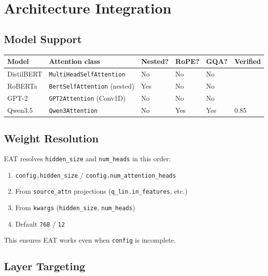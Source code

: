 
\section{Architecture Integration}

\subsection{Model Support}

\begin{table}[H]
\centering
\small
\begin{tabular}{llllll}
\toprule
\textbf{Model} & \textbf{Attention class} & \textbf{Nested?} & \textbf{RoPE?} & \textbf{GQA?} & \textbf{Verified} \\
\midrule
DistilBERT & \texttt{MultiHeadSelfAttention} & No & No & No &  \\
RoBERTa & \texttt{BertSelfAttention} (nested) & Yes & No & No &  \\
GPT-2 & \texttt{GPT2Attention} (Conv1D) & No & No & No &  \\
Qwen3.5 & \texttt{Qwen3Attention} & No & Yes & Yes & 0.85 \\
\bottomrule
\end{tabular}
\end{table}

\subsection{Weight Resolution}

EAT resolves \texttt{hidden\_size} and \texttt{num\_heads} in this order:

\begin{enumerate}
\item \texttt{config.hidden\_size} / \texttt{config.num\_attention\_heads}
\item From \texttt{source\_attn} projections (\texttt{q\_lin.in\_features}, etc.)
\item From \texttt{kwargs} (\texttt{hidden\_size}, \texttt{num\_heads})
\item Default \texttt{768} / \texttt{12}

\end{enumerate}
This ensures EAT works even when \texttt{config} is incomplete.

\subsection{Layer Targeting}

